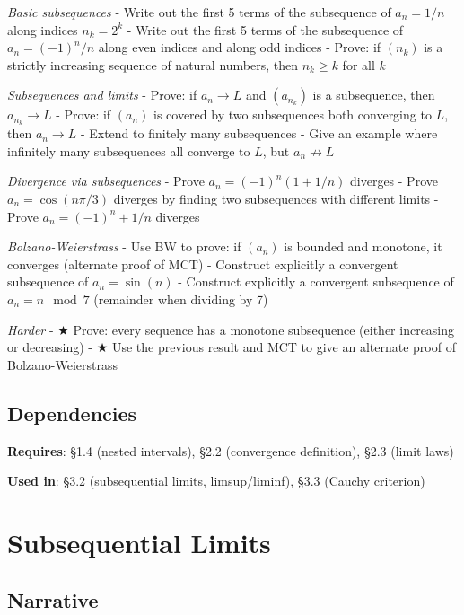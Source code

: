 \documentclass[
  10pt,
  letterpaper,
]{scrbook}
\begin{document}
\emph{Basic subsequences} - Write out the first 5 terms of the
subsequence of \(a_n = 1/n\) along indices \(n_k = 2^k\) - Write out the
first 5 terms of the subsequence of \(a_n = (-1)^n / n\) along even
indices and along odd indices - Prove: if \((n_k)\) is a strictly
increasing sequence of natural numbers, then \(n_k \geq k\) for all
\(k\)

\emph{Subsequences and limits} - Prove: if \(a_n \to L\) and
\((a_{n_k})\) is a subsequence, then \(a_{n_k} \to L\) - Prove: if
\((a_n)\) is covered by two subsequences both converging to \(L\), then
\(a_n \to L\) - Extend to finitely many subsequences - Give an example
where infinitely many subsequences all converge to \(L\), but
\(a_n \not\to L\)

\emph{Divergence via subsequences} - Prove \(a_n = (-1)^n (1 + 1/n)\)
diverges - Prove \(a_n = \cos(n\pi/3)\) diverges by finding two
subsequences with different limits - Prove \(a_n = (-1)^n + 1/n\)
diverges

\emph{Bolzano-Weierstrass} - Use BW to prove: if \((a_n)\) is bounded
and monotone, it converges (alternate proof of MCT) - Construct
explicitly a convergent subsequence of \(a_n = \sin(n)\) - Construct
explicitly a convergent subsequence of \(a_n = n \mod 7\) (remainder
when dividing by 7)

\emph{Harder} - ★ Prove: every sequence has a monotone subsequence
(either increasing or decreasing) - ★ Use the previous result and MCT to
give an alternate proof of Bolzano-Weierstrass

\subsection{Dependencies}\label{dependencies-11}

\textbf{Requires}: §1.4 (nested intervals), §2.2 (convergence
definition), §2.3 (limit laws)

\textbf{Used in}: §3.2 (subsequential limits, limsup/liminf), §3.3
(Cauchy criterion)

\section{Subsequential Limits}\label{subsequential-limits}

\subsection{Narrative}\label{narrative-12}
\end{document}
